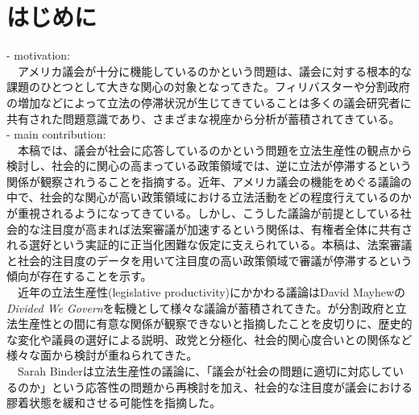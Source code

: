 \documentclass[here]{article}
\begin{document}
\section{はじめに}
- motivation: 
\\
　アメリカ議会が十分に機能しているのかという問題は、議会に対する根本的な課題のひとつとして大きな関心の対象となってきた。フィリバスター\citep*{Koger2010-uc,Binder2001-eb}や分割政府の増加\citet*{Fiorina1992-iz,Fiorina1992-mp}などによって立法の停滞状況が生じてきていることは多くの議会研究者に共有された問題意識であり、さまざまな視座から分析が蓄積されてきている。\\
- main contribution: 
\\
　本稿では、議会が社会に応答しているのかという問題を立法生産性の観点から検討し、社会的に関心の高まっている政策領域では、逆に立法が停滞するという関係が観察されうることを指摘する。近年、アメリカ議会の機能をめぐる議論の中で、社会的な関心が高い政策領域における立法活動をどの程度行えているのかが重視されるようになってきている。\citep*{Binder2003-bn,Binder2017-wr,Adler2013-ay}しかし、こうした議論が前提としている社会的な注目度が高まれば法案審議が加速するという関係は、有権者全体に共有される選好という実証的に正当化困難な仮定に支えられている。本稿は、法案審議と社会的注目度のデータを用いて注目度の高い政策領域で審議が停滞するという傾向が存在することを示す。\\
　近年の立法生産性(legislative productivity)にかかわる議論はDavid Mayhewの\textit{Divided We Govern}を転機として様々な議論が蓄積されてきた。\citet*{Mayhew1991-rq}が分割政府と立法生産性との間に有意な関係が観察できないと指摘したことを皮切りに、歴史的な変化\citep*{Fiorina1992-iz}や議員の選好による説明\citep*{Krehbiel1998-ob,Krehbiel2010-ob}、政党と分極化\citep*{Thorson1998-vs,Jones2001-ds}、社会的関心度合いとの関係\citep*{Gibson1995-ou,Coleman1999-ld,Binder1999-fl,Binder2003-bn,Binder2017-wr}など様々な面から検討が重ねられてきた。\\
　Sarah Binderは立法生産性の議論に、「議会が社会の問題に適切に対応しているのか」という応答性の問題から再検討を加え、社会的な注目度が議会における膠着状態を緩和させる可能性を指摘した。\citep*{Binder2003-bn}\\
\\
\end{document}
